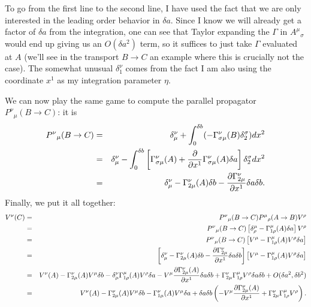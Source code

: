 To go from the first line to the second line, I have used the fact that we are only interested in the leading order behavior in $\delta a$. Since I know we will already get a factor of $\delta a$ from the integration, one can see that Taylor expanding the $\Gamma$ in ${A^\mu}_\sigma$ would end up giving us an $O(\delta a^2)$ term, so it suffices to just take $\Gamma$ evaluated at $A$ (we'll see in the transport $B\to C$ an example where this is crucially not the case). The somewhat unusual $\delta^\nu_1$ comes from the fact I am also using the coordinate $x^1$ as my integration parameter $\eta$.

We can now play the same game to compute the parallel propagator ${P^\nu}_\mu(B\to C)$: it is
\begin{eqnarray*}
{P^\nu}_\mu(B\to C)&=&\delta^\nu_\mu +\int_0^{\delta b} (-\Gamma^\nu_{\sigma \mu}(B)\delta^\sigma_2) dx^2\\
&=&\delta^\nu_\mu -\int_0^{\delta b}\left[\Gamma^\nu_{\sigma \mu}(A)+\frac{\partial}{\partial x^1}\Gamma^\nu_{\sigma\mu}(A)\delta a\right]\delta^\sigma_2 dx^2\\
&=&\delta^\nu_\mu-\Gamma^\nu_{2 \mu}(A) \delta b - \frac{\partial\Gamma^\nu_{2\mu}}{\partial x^1}\delta a \delta b.
\end{eqnarray*}
Finally, we put it all together:
\begin{eqnarray*}
V^\nu(C)&=& {P^\nu}_\mu(B\to C){P^\mu}_\rho(A\to B) V^\rho\\
&=&{P^\nu}_\mu(B\to C) \left[\delta^\mu_\rho -\Gamma^\mu_{1\rho}(A) \delta a\right] V^\rho\\
&=&{P^\nu}_\mu(B\to C)\left[ V^\mu-\Gamma^\mu_{1\rho}(A) V^\rho \delta a\right]\\
&=&\left[\delta^\nu_\mu-\Gamma^\nu_{2 \mu}(A) \delta b - \frac{\partial\Gamma^\nu_{2\mu}}{\partial x^1}\delta a \delta b\right]\left[ V^\mu-\Gamma^\mu_{1\rho}(A) V^\rho \delta a\right]\\
&=&V^\nu(A)-\Gamma^\nu_{2\mu}(A)V^\mu \delta b - \delta^\nu_\mu\Gamma^\mu_{1\rho}(A) V^\rho \delta a - V^\mu \frac{\partial \Gamma^\nu_{2\mu}(A)}{\partial x^1}\delta a \delta b +\Gamma^\nu_{2\mu} \Gamma^\mu_{1\rho}V^\rho \delta a \delta b+O(\delta a^2,\delta b^2)\\
&=&V^\nu(A)-\Gamma^\nu_{2\mu}(A)V^\mu \delta b - \Gamma^\nu_{1\mu}(A) V^\mu \delta a + \delta a \delta b \left(-V^\mu \frac{\partial \Gamma^\nu_{2\mu}(A)}{\partial x^1} +\Gamma^\nu_{2\mu} \Gamma^\mu_{1\rho}V^\rho \right).
\end{eqnarray*}

